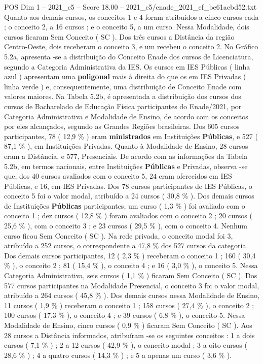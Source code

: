 \begin{textsample}{POS Dim 1 – 2021\_c5 – Score 18.00 – 2021\_c5/enade\_2021\_ef\_be61acbd52.txt}
Quanto aos demais cursos, os conceitos 1 e 4 foram atribuídos a cinco cursos cada ; o conceito 2, a 16 cursos ; e o conceito 5, a um curso.
Nessa Modalidade, dois cursos ficaram Sem Conceito ( SC ).
Dos três cursos a Distância da região Centro-Oeste, dois receberam o conceito 3, e um recebeu o conceito 2.
No Gráfico 5.2a, apresenta -se a distribuição do Conceito Enade dos cursos de Licenciatura, segundo a Categoria Administrativa da IES.
Os cursos em IES Públicas ( linha azul ) apresentam uma \textbf{poligonal} mais à direita do que os em IES Privadas ( linha verde ) e, consequentemente, uma distribuição de Conceito Enade com valores maiores.
Na Tabela 5.2b, é apresentada a distribuição dos cursos dos cursos de Bacharelado de Educação Física participantes do Enade/2021, por Categoria Administrativa e Modalidade de Ensino, de acordo com os conceitos por eles alcançados, segundo as Grandes Regiões brasileiras.
Dos 605 cursos participantes, 78 ( 12,9 \% ) eram \textbf{ministrados} em Instituições \textbf{Públicas}, e 527 ( 87,1 \% ), em Instituições Privadas.
Quanto à Modalidade de Ensino, 28 cursos eram a Distância, e 577, Presenciais.
De acordo com as informações da Tabela 5.2b, em termos nacionais, entre Instituições \textbf{Públicas} e Privadas, observa -se que, dos 40 cursos avaliados com o conceito 5, 24 eram oferecidos em IES Públicas, e 16, em IES Privadas.
Dos 78 cursos participantes de IES Públicas, o conceito 5 foi o valor modal, atribuído a 24 cursos ( 30,8 \% ).
Dos demais cursos de Instituições \textbf{Públicas} participantes, um curso ( 1,3 \% ) foi avaliado com o conceito 1 ; dez cursos ( 12,8 \% ) foram avaliados com o conceito 2 ; 20 cursos ( 25,6 \% ), com o conceito 3 ; e 23 cursos ( 29,5 \% ), com o conceito 4.
Nenhum curso ficou Sem Conceito ( SC ).
Na rede privada, o conceito modal foi 3, atribuído a 252 cursos, o correspondente a 47,8 \% dos 527 cursos da categoria.
Dos demais cursos participantes, 12 ( 2,3 \% ) receberam o conceito 1 ; 160 ( 30,4 \% ), o conceito 2 ; 81 ( 15,4 \% ), o conceito 4 ; e 16 ( 3,0 \% ), o conceito 5.
Nessa Categoria Administrativa, seis cursos ( 1,1 \% ) ficaram Sem Conceito ( SC ).
Dos 577 cursos participantes na Modalidade Presencial, o conceito 3 foi o valor modal, atribuído a 264 cursos ( 45,8 \% ).
Dos demais cursos nessa Modalidade de Ensino, 11 cursos ( 1,9 \% ) receberam o conceito 1 ; 158 cursos ( 27,4 \% ), o conceito 2 ; 100 cursos ( 17,3 \% ), o conceito 4 ; e 39 cursos ( 6,8 \% ), o conceito 5.
Nessa Modalidade de Ensino, cinco cursos ( 0,9 \% ) ficaram Sem Conceito ( SC ).
Aos 28 cursos a Distância informados, atribuíram -se os seguintes conceitos : 1 a dois cursos ( 7,1 \% ) ; 2 a 12 cursos ( 42,9 \% ), o conceito modal ; 3 a oito cursos ( 28,6 \% ) ; 4 a quatro cursos ( 14,3 \% ) ; e 5 a apenas um curso ( 3,6 \% ).

\end{textsample}
